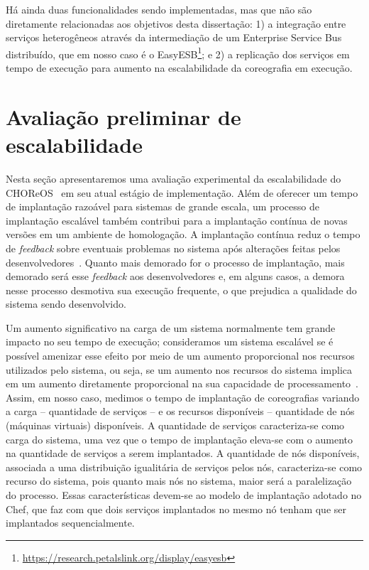 Há ainda duas funcionalidades sendo implementadas, mas que não são diretamente relacionadas aos objetivos desta dissertação: 1) a integração entre serviços heterogêneos através da intermediação de um Enterprise  Service Bus distribuído, que em nosso caso é o EasyESB\footnote{\url{https://research.petalslink.org/display/easyesb}}; e 2) a replicação dos serviços em tempo de execução para aumento na escalabilidade da coreografia em execução.

\section{Avaliação preliminar de escalabilidade}
\label{sec:avaliacao}

Nesta seção apresentaremos uma avaliação experimental da escalabilidade do CHOReOS \ee\ em seu atual estágio de implementação. Além de oferecer um tempo de implantação razoável para sistemas de grande escala, um processo de implantação escalável também contribui para a implantação contínua de novas versões em um ambiente de homologação. A implantação contínua reduz o tempo de \textit{feedback} sobre eventuais problemas no sistema após alterações feitas pelos desenvolvedores~\cite{Humble2011Continuous}. Quanto mais demorado for o processo de implantação, mais demorado será esse \textit{feedback} aos desenvolvedores e, em alguns casos, a demora nesse processo desmotiva sua execução frequente, o que prejudica a qualidade do sistema sendo desenvolvido.

Um aumento significativo na carga de um sistema normalmente tem grande impacto no seu tempo de execução; consideramos um sistema escalável se é possível amenizar esse efeito por meio de um aumento proporcional nos recursos utilizados pelo sistema, ou seja, se um aumento nos recursos do sistema implica em um aumento diretamente proporcional na sua capacidade de processamento~\cite{Law1998Scalable}. Assim, em nosso caso, medimos o tempo de implantação de coreografias variando a carga -- quantidade de serviços -- e os recursos disponíveis -- quantidade de nós (máquinas virtuais) disponíveis. A quantidade de serviços caracteriza-se como carga do sistema, uma vez que o tempo de implantação eleva-se com o aumento na quantidade de serviços a serem implantados. A quantidade de nós disponíveis, associada a uma distribuição igualitária de serviços pelos nós, caracteriza-se como recurso do sistema, pois quanto mais nós no sistema, maior será a paralelização do processo. Essas características devem-se ao modelo de implantação adotado no Chef, que faz com que dois serviços implantados no mesmo nó tenham que ser implantados sequencialmente.

